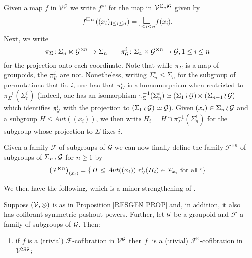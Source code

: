 \documentclass[a4paper,10pt
,draft
]{article}%
\renewcommand{\F}{\mathcal F}
\renewcommand{\1}{\eta}%
\begin{document}
Given a map $f$ in $\mathcal{V}^{\mathcal{G}}$
we write 
$f^{\square n}$ 
for the map in $\mathcal{V}^{\Sigma_n \wr \mathcal{G}}$
given by
\begin{equation}\label{FSQNDEF EQ}
f^{\square n}\left((x_i)_{1\leq i \leq n }\right)
=
\underset{1\leq i \leq n}{\mathlarger{\mathlarger{\square}}} f(x_i).
\end{equation}
Next, we write
\[
\pi_{\Sigma} \colon \Sigma_n \ltimes \mathcal{G}^{\times n} \to \Sigma_n
\qquad
\pi^i_{\mathcal{G}} \colon \Sigma_n \ltimes \mathcal{G}^{\times n} \to \mathcal{G}, 1\leq i \leq n
\]
for the projection onto each coordinate.
Note that while $\pi_{\Sigma}$ is a map of groupoids, 
the $\pi^i_{\mathcal{G}}$ are not.
Nonetheless, writing $\Sigma^i_n \leq \Sigma_n$
for the subgroup of permutations that fix $i$, 
one has that $\pi_{G}^i$ is a homomorphism when restricted to 
$\pi^{-1}_{\Sigma}(\Sigma_n^i)$ 
(indeed, one has an isomorphism 
$\pi^{-1}_{\Sigma}(\Sigma_n^i) \simeq 
(\Sigma_{1} \wr \mathcal{G}) \times (\Sigma_{n-1} \wr \mathcal{G})$
which identifies $\pi_{\mathcal{G}}^i$ with the projection to 
$(\Sigma_{1} \wr \mathcal{G}) \simeq \mathcal{G}$).
Given $(x_i) \in \Sigma_n \wr \mathcal{G}$
and a subgroup
$H \leq Aut((x_i))$,
we then write
$H_i = H \cap \pi^{-1}_{\Sigma}(\Sigma_n^i)$
for the subgroup whose projection to $\Sigma$ fixes $i$.

Given a family $\F$ of subgroups of $\mathcal{G}$
we can now finally define the family $\F^{\ltimes n}$
of subgroups of $\Sigma_n \wr \mathcal{G}$ for $n\geq 1$ by
\begin{equation}\label{FWRNXI EQ}
\left(\F^{\ltimes n}\right)_{(x_i)}
=
\left\{
H \leq Aut((x_i))|
\pi^i_{\G}(H_i) \in \F_{x_i} \text{ for all i}
\right\}
\end{equation}

We then have the following, which is a minor strengthening of 
\cite[Prop. 6.24]{BP_geo}.

\begin{proposition}\label{SIGMAWRGF PROP}
Suppose $(\mathcal V, \otimes)$ is as in Proposition \ref{RESGEN PROP} and, in addition, it also has cofibrant symmetric pushout powers.
Further, let $\mathcal{G}$ be a groupoid and
$\F$ a family of subgroups of $\mathcal{G}$.
Then:
\begin{enumerate}[label=(\roman*)]
\item if $f$ is a (trivial) $\F$-cofibration in $\mathcal V^{\mathcal{G}}$
then $f^{\square}$ is a (trivial)
$\F^{\ltimes}$-cofibration in $\mathcal V^{\Sigma \wr \mathcal{G}}$;
\end{enumerate}
\end{proposition}
\end{document}
